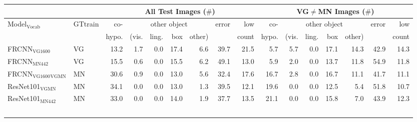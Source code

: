 \begin{table}[t]
	\centering
	\small
	\begin{tabular}{ll|r@{~}|r@{~}r@{~}r@{~}r@{~}|r@{~}r@{~}||r@{~}|r@{~}r@{~}r@{~}r@{~}|r@{~}r@{~}}
		\toprule
		&& \multicolumn{7}{c}{All Test Images ($\#$)} 
		& \multicolumn{7}{c}{VG$\neq$MN Images ($\#$)}\\
		\toprule
		Model$_{\text{Vocab}}$ & GTtrain  
		&  co- &  \multicolumn{4}{c}{other object}  &  error &  low 
		&  co- &  \multicolumn{4}{c}{other object}  &  error &  low \\
		& & hypo. & (vis. &  ling. &  box &  other)   & & count 
		&  hypo. & (vis. &  ling. &  box &  other) &   & count     \\
		 
	\midrule
	FRCNN$_{\text{VG1600}}$ & VG     &                 13.2 &             1.7 &                 0.0 &                  17.4 &            6.6 &           39.7 &             21.5 &                  5.7 &             5.7 &                 0.0 &                  17.1 &           14.3 &           42.9 &             14.3 \\
	FRCNN$_{\text{MN442}}$ & VG       &                 15.5 &             0.6 &                 0.0 &                  15.5 &            6.2 &           49.1 &             13.0 &                  5.9 &             2.0 &                 0.0 &                  13.7 &           11.8 &           54.9 &             11.8 \\
	\midrule \midrule
	FRCNN$_{\text{VG1600}}$$_{\text{VGMN}}$ & MN &                 30.6 &             0.9 &                 0.0 &                  13.0 &            5.6 &           32.4 &             17.6 &                 16.7 &             2.8 &                 0.0 &                  16.7 &           11.1 &           41.7 &             11.1 \\
	\midrule
	ResNet101$_{\text{VGMN}}$ & MN	&                 34.1 &             0.0 &                 0.0 &                  13.0 &            1.3 &           39.5 &             12.1 &                 19.6 &             0.0 &                 0.0 &                  12.5 &            5.4 &           51.8 &             10.7 \\
	ResNet101$_{\text{MN442}}$ & MN  &                 33.0 &             0.0 &                 0.0 &                  14.0 &            1.9 &           37.7 &             13.5 &                 21.1 &             0.0 &                 0.0 &                  15.8 &            7.0 &           43.9 &             12.3 \\
$$
\end{tabular}
\end{table}
